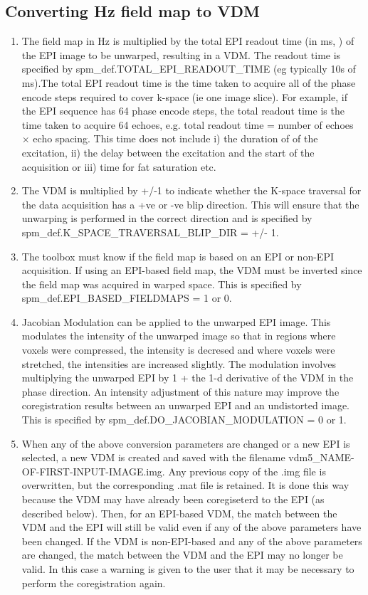 \subsection{Converting Hz field map to VDM}
\begin{enumerate}
\item{The field map in Hz is multiplied by the total EPI readout time (in ms, ) of the EPI image to be unwarped, resulting in a VDM. The readout time is specified by spm\_def.TOTAL\_EPI\_READOUT\_TIME (eg typically 10s of ms).The total EPI readout time is the time taken to acquire all of the phase encode steps required to cover k-space (ie one image slice). For example, if the EPI sequence has 64 phase encode steps, the total readout time is the time taken to acquire 64 echoes, e.g. total readout time = number of echoes $\times$ echo spacing. This time does not include i) the duration of of the excitation, ii) the delay between the excitation and the start of the acquisition or iii) time for fat saturation etc.
}
\item{The VDM is multiplied by +/-1 to indicate whether the K-space traversal for the data acquisition has a +ve or -ve blip direction. This will ensure that the unwarping is performed in the correct direction and is specified by spm\_def.K\_SPACE\_TRAVERSAL\_BLIP\_DIR = +/- 1.
}
\item{The toolbox must know if the field map is based on an EPI or non-EPI acquisition. If using an EPI-based field map, the VDM must be inverted since the field map was acquired in warped space. This is specified by spm\_def.EPI\_BASED\_FIELDMAPS = 1 or 0.
}
\item{Jacobian Modulation can be applied to the unwarped EPI image. This modulates the intensity of the unwarped image so that in regions where voxels were compressed, the intensity is decresed and where voxels were stretched, the intensities are increased slightly. The modulation involves multiplying the unwarped EPI by 1 + the 1-d derivative of the VDM in the phase direction. An intensity adjustment of this nature may improve the coregistration results between an unwarped EPI and an undistorted image. This is specified by spm\_def.DO\_JACOBIAN\_MODULATION = 0 or 1.   
}
\item{When any of the above conversion parameters are changed or a new EPI is selected, a new VDM is created and saved with the filename vdm5\_NAME-OF-FIRST-INPUT-IMAGE.img. Any previous copy of the .img file is overwritten, but the corresponding .mat file is retained. It is done this way because the VDM may have already been coregiseterd to the EPI (as described below). Then, for an EPI-based VDM, the match between the VDM and the EPI will still be valid even if any of the above parameters have been changed. If the VDM is non-EPI-based and any of the above parameters are changed, the match between the VDM and the EPI may no longer be valid. In this case a warning is given to the user that it may be necessary to perform the coregistration again.
}
\end{enumerate}
 
